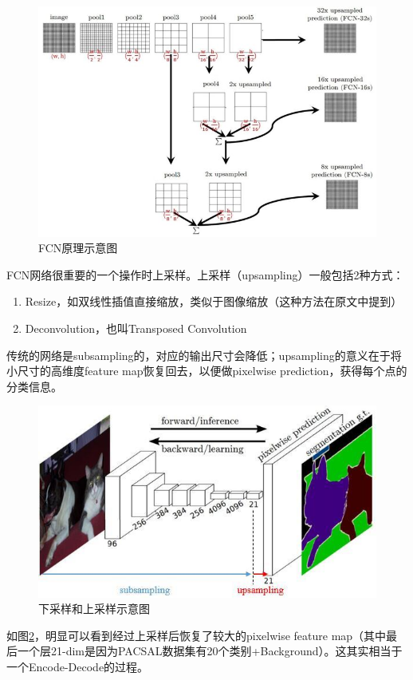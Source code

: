 \begin{figure}[htbp]
\centering
\includegraphics[width=0.8\linewidth]{body/theory_pic/4}
\caption{FCN原理示意图}
\label{fig::theory4}
\end{figure}

FCN网络很重要的一个操作时上采样。上采样（upsampling）一般包括2种方式：

\begin{enumerate}
\def\labelenumi{\arabic{enumi}.}
\tightlist
\item
  Resize，如双线性插值直接缩放，类似于图像缩放（这种方法在原文中提到）
\item
  Deconvolution，也叫Transposed Convolution
\end{enumerate}

传统的网络是subsampling的，对应的输出尺寸会降低；upsampling的意义在于将小尺寸的高维度feature
map恢复回去，以便做pixelwise prediction，获得每个点的分类信息。

\begin{figure}[htbp]
\centering
\includegraphics[width=0.8\linewidth]{body/theory_pic/5}
\caption{下采样和上采样示意图}
\label{fig::theory5}
\end{figure}

如图\ref{fig::theory5}，明显可以看到经过上采样后恢复了较大的pixelwise feature
map（其中最后一个层21-dim是因为PACSAL数据集有20个类别+Background）。这其实相当于一个Encode-Decode的过程。

